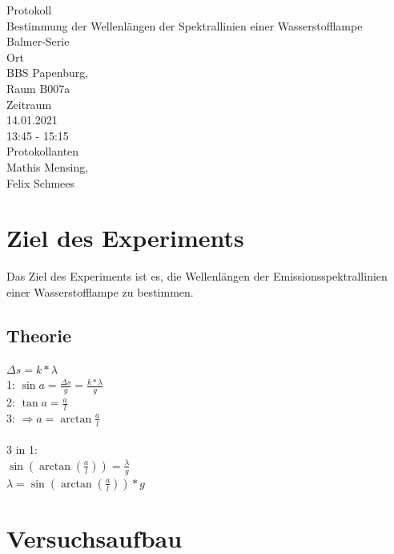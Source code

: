 \documentclass[12pt, a4paper]{article}
\begin{document}
\begin{titlepage}
\begin{center}
    \large{Protokoll} \\
    \LARGE{Bestimmung der Wellenlängen der Spektrallinien einer Wasserstofflampe} \\
    \Large{Balmer-Serie} \\
    \vspace{10mm}
    \small{Ort} \\
    \Large{ BBS Papenburg,\\ 
            Raum B007a} \\
    \vspace{10mm}
    \small{Zeitraum} \\
    \Large{ 14.01.2021 \\
            13:45 - 15:15} \\
    \vspace{15mm}
    \small{Protokollanten} \\
    \Large{ Mathis Mensing, \\
            Felix Schmees }
\end{center}

\thispagestyle{empty}
\end{titlepage}

\tableofcontents
\newpage

\section{Ziel des Experiments}
Das Ziel des Experiments ist es, die Wellenlängen der Emissionsspektrallinien einer Wasserstofflampe zu bestimmen.

\subsection{Theorie}
$\Delta s = k * \lambda$ \\
1: $\sin a = \frac{\Delta s}{g} = \frac{k * \lambda}{g}$ \\
2: $\tan a = \frac{a}{l}$ \\
3: $\Rightarrow a = \arctan \frac{a}{l}$ \\\\
3 in 1:\\
$\sin(\arctan(\frac{a}{l})) = \frac{\lambda}{g}$ \\
$\lambda = \sin(\arctan(\frac{a}{l})) * g$

\section{Versuchsaufbau}
\end{document}
